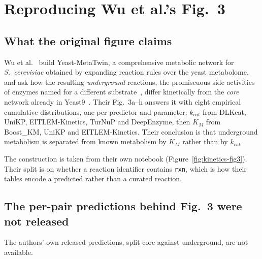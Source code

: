 
\section{Reproducing Wu et al.'s Fig.~3}

\subsection{What the original figure claims}

Wu et al.~\cite{wuSystematicallyExploringYeast2026} build Yeast-MetaTwin, a comprehensive
metabolic network for \emph{S.~cerevisiae} obtained by expanding reaction rules over the
yeast metabolome, and ask how the resulting \emph{underground} reactions, the promiscuous
side activities of enzymes named for a different
substrate~\cite{demouraferreiraProteinconstrainedModelsPinpoints2025}, differ kinetically
from the \emph{core} network already in
Yeast9~\cite{zhangYeast9ConsensusGenomescale2024}. Their Fig.~3a--h answers it with eight empirical
cumulative distributions, one per predictor and parameter: $k_{cat}$ from DLKcat, UniKP,
EITLEM-Kinetics, TurNuP and DeepEnzyme, then $K_M$ from Boost\_KM, UniKP and
EITLEM-Kinetics. Their conclusion is that underground metabolism is separated from known
metabolism by $K_M$ rather than by $k_{cat}$.

The construction is taken from their own notebook (Figure~\ref{fig:kinetics-fig3}). Their
split is on
whether a reaction identifier contains \texttt{rxn}, which is how their tables encode a
predicted rather than a curated reaction.

\subsection{The per-pair predictions behind Fig.~3 were not released}

The authors' own released predictions, split core against underground, are not available.

